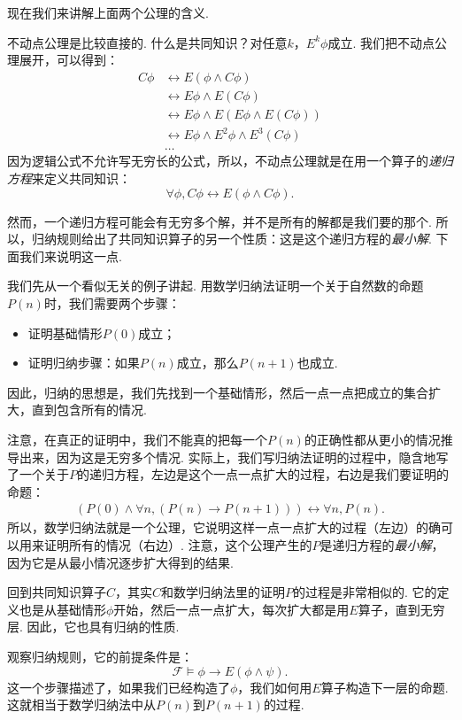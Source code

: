 现在我们来讲解上面两个公理的含义. 

不动点公理是比较直接的. 什么是共同知识？对任意$k$，$E^k\phi$成立. 我们把不动点公理展开，可以得到：
\begin{align*}
    C\phi&\leftrightarrow E(\phi\wedge C\phi)\\
    &\leftrightarrow E\phi\wedge E(C\phi)\\
    &\leftrightarrow E\phi\wedge E(E\phi\wedge E(C\phi))\\
    &\leftrightarrow E\phi\wedge E^2\phi\wedge E^3(C\phi)\\
    &\dots
\end{align*}
因为逻辑公式不允许写无穷长的公式，所以，不动点公理就是在用一个算子的\textit{递归方程}来定义共同知识：
\[\forall\phi,C\phi\leftrightarrow E(\phi\wedge C\phi). \]

然而，一个递归方程可能会有无穷多个解，并不是所有的解都是我们要的那个. 所以，归纳规则给出了共同知识算子的另一个性质：这是这个递归方程的\textit{最小解}. 下面我们来说明这一点. 

我们先从一个看似无关的例子讲起. 用数学归纳法证明一个关于自然数的命题$P(n)$时，我们需要两个步骤：
\begin{itemize}
    \item 证明基础情形$P(0)$成立；
    \item 证明归纳步骤：如果$P(n)$成立，那么$P(n+1)$也成立. 
\end{itemize}
因此，归纳的思想是，我们先找到一个基础情形，然后一点一点把成立的集合扩大，直到包含所有的情况. 

注意，在真正的证明中，我们不能真的把每一个$P(n)$的正确性都从更小的情况推导出来，因为这是无穷多个情况. 实际上，我们写归纳法证明的过程中，隐含地写了一个关于$P$的递归方程，左边是这个一点一点扩大的过程，右边是我们要证明的命题：
\begin{align*}
    (P(0)\wedge\forall n,(P(n)\to P(n+1)))\leftrightarrow\forall n,P(n).
\end{align*}
所以，数学归纳法就是一个公理，它说明这样一点一点扩大的过程（左边）的确可以用来证明所有的情况（右边）. 注意，这个公理产生的$P$是递归方程的\textit{最小解}，因为它是从最小情况逐步扩大得到的结果. 

回到共同知识算子$C$，其实$C$和数学归纳法里的证明$P$的过程是非常相似的. 它的定义也是从基础情形$\phi$开始，然后一点一点扩大，每次扩大都是用$E$算子，直到无穷层. 因此，它也具有归纳的性质. 

观察归纳规则，它的前提条件是：
\[\mathcal F\vDash \phi\to E(\phi\wedge\psi).\]
这一个步骤描述了，如果我们已经构造了$\phi$，我们如何用$E$算子构造下一层的命题. 这就相当于数学归纳法中从$P(n)$到$P(n+1)$的过程. 


